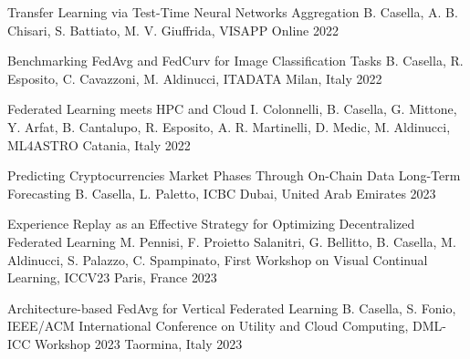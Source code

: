 



\begin{cvhonors}

  \cvhonor
    {Transfer Learning via Test-Time Neural Networks Aggregation} %
    {B. Casella, A. B. Chisari, S. Battiato, M. V. Giuffrida, VISAPP} %
    {Online} %
    {2022} %

  \cvhonor
    {Benchmarking FedAvg and FedCurv for Image Classification Tasks} %
    {B. Casella, R. Esposito, C. Cavazzoni, M. Aldinucci, ITADATA} %
    {Milan, Italy} %
    {2022} %

  \cvhonor
    {Federated Learning meets HPC and Cloud} %
    {I. Colonnelli, B. Casella, G. Mittone, Y. Arfat, B. Cantalupo, R. Esposito, A. R. Martinelli, D. Medic, M. Aldinucci, ML4ASTRO} %
    {Catania, Italy} %
    {2022} %

  \cvhonor
    {Predicting Cryptocurrencies Market Phases Through On-Chain Data Long-Term Forecasting} %
    {B. Casella, L. Paletto, ICBC} %
    {Dubai, United Arab Emirates} %
    {2023} %
    
  \cvhonor
    {Experience Replay as an Effective Strategy for Optimizing Decentralized Federated Learning} %
    {M. Pennisi, F. Proietto Salanitri, G. Bellitto, B. Casella, M. Aldinucci, S. Palazzo, C. Spampinato, First Workshop on Visual Continual Learning, ICCV23} %
    {Paris, France} %
    {2023} %

	\cvhonor
    {Architecture-based FedAvg for Vertical Federated Learning} %
    {B. Casella, S. Fonio, IEEE/ACM International Conference on Utility and Cloud Computing, DML-ICC Workshop 2023} %
    {Taormina, Italy} %
    {2023} %
    

\end{cvhonors}
